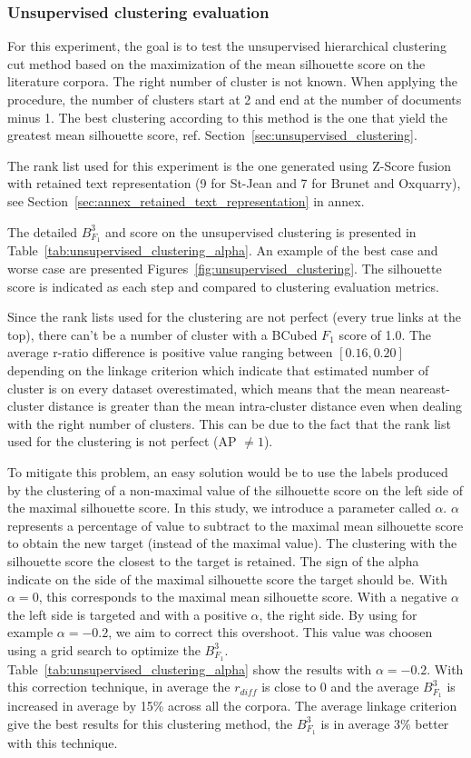 \subsubsection{Unsupervised clustering evaluation}

For this experiment, the goal is to test the unsupervised hierarchical clustering cut method based on the maximization of the mean silhouette score on the literature corpora.
The right number of cluster is not known.
When applying the procedure, the number of clusters start at 2 and end at the number of documents minus 1.
The best clustering according to this method is the one that yield the greatest mean silhouette score, ref. Section~\ref{sec:unsupervised_clustering}.

The rank list used for this experiment is the one generated using Z-Score fusion with retained text representation (9 for St-Jean and 7 for Brunet and Oxquarry), see Section~\ref{sec:annex_retained_text_representation} in annex.

The detailed $B^3_{F_1}$ and score on the unsupervised clustering is presented in Table~\ref{tab:unsupervised_clustering_alpha}.
An example of the best case and worse case are presented Figures~\ref{fig:unsupervised_clustering}.
The silhouette score is indicated as each step and compared to clustering evaluation metrics.

Since the rank lists used for the clustering are not perfect (every true links at the top), there can't be a number of cluster with a BCubed $F_1$ score of 1.0.
The average r-ratio difference is positive value ranging between $\left[0.16, 0.20\right]$ depending on the linkage criterion which indicate that estimated number of cluster is on every dataset overestimated, which means that the mean neareast-cluster distance is greater than the mean intra-cluster distance even when dealing with the right number of clusters.
This can be due to the fact that the rank list used for the clustering is not perfect (AP $\neq 1$).

To mitigate this problem, an easy solution would be to use the labels produced by the clustering of a non-maximal value of the silhouette score on the left side of the maximal silhouette score.
In this study, we introduce a parameter called $\alpha$.
$\alpha$ represents a percentage of value to subtract to the maximal mean silhouette score to obtain the new target (instead of the maximal value).
The clustering with the silhouette score the closest to the target is retained.
The sign of the alpha indicate on the side of the maximal silhouette score the target should be.
With $\alpha = 0$, this corresponds to the maximal mean silhouette score.
With a negative $\alpha$ the left side is targeted and with a positive $\alpha$, the right side.
By using for example $\alpha = -0.2$, we aim to correct this overshoot.
This value was choosen using a grid search to optimize the $B^3_{F_1}$.
Table~\ref{tab:unsupervised_clustering_alpha} show the results with $\alpha = -0.2$.
With this correction technique, in average the $r_{diff}$ is close to 0 and the average $B^3_{F_1}$ is increased in average by 15\% across all the corpora.
The average linkage criterion give the best results for this clustering method, the $B^3_{F_1}$ is in average 3\% better with this technique.

